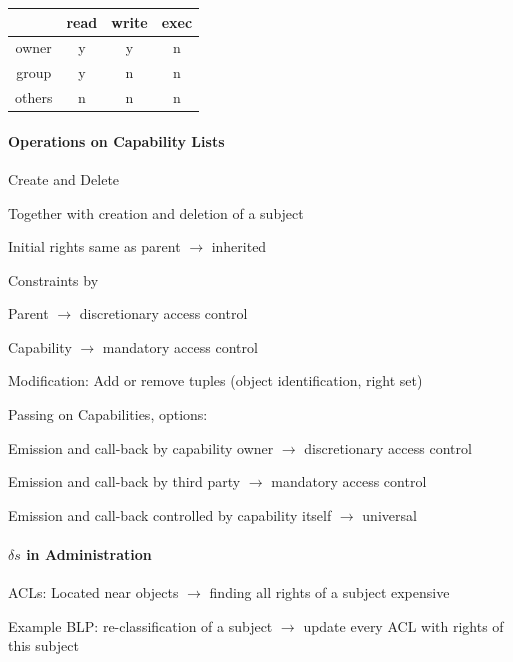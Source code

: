 \documentclass[a4paper]{article}
\begin{document}
\begin{multicols}{3}
\begin{multicols}{2}
    \begin{tabular}{c | c | c| c}
               & read & write & exec \\\hline
        owner  & y    & y     & n    \\
        group  & y    & n     & n    \\
        others & n    & n     & n
    \end{tabular}
\end{multicols}

    \paragraph{Operations on Capability Lists}
    Create and Delete
    \begin{itemize*}
        \item Together with creation and deletion of a subject
        \item Initial rights same as parent $\rightarrow$ inherited
        \item Constraints by
        \begin{itemize*}
            \item Parent $\rightarrow$ discretionary access control
            \item Capability $\rightarrow$ mandatory access control
        \end{itemize*}
    \end{itemize*}

    Modification: Add or remove tuples (object identification, right set)

    Passing on Capabilities, options:
    \begin{itemize*}
        \item Emission and call-back by capability owner $\rightarrow$ discretionary access control
        \item Emission and call-back by third party $\rightarrow$ mandatory access control
        \item Emission and call-back controlled by capability itself $\rightarrow$ universal
    \end{itemize*}

    \paragraph{$\delta s$ in Administration}
    ACLs: Located near objects $\rightarrow$ finding all rights of a subject expensive

    Example BLP: re-classification of a subject $\rightarrow$ update every ACL with rights of this subject


\end{multicols}
\end{document}
